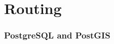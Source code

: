 \documentclass{beamer}
\begin{document}


\section{Routing}




\begin{frame}
  \frametitle{PostgreSQL and PostGIS}

\end{frame}










\end{document}
